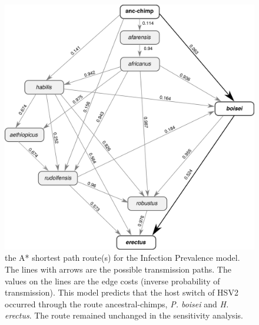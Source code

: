 \documentclass[fleqn,10pt]{wlscirep}
\begin{document}
\begin{figure}
  \centering
  \includegraphics[width=\textwidth]{figs/dag-ip}
  \caption{the A* shortest path route(s) for the Infection Prevalence model. The lines with arrows are the possible transmission paths. The values on the lines are the edge costs (inverse probability of transmission). This model predicts that the host switch of HSV2 occurred through the route ancestral-chimps, \textit{P. boisei} and \textit{H. erectus}. The route remained unchanged in the sensitivity analysis.}
  \label{fig:dag-ip}   
\end{figure}  
\end{document}

